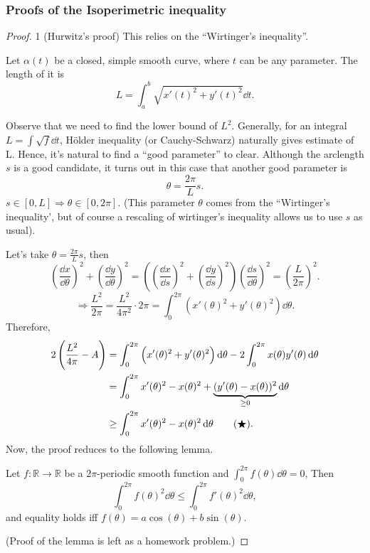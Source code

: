 \subsubsection*{Proofs of the Isoperimetric inequality}
\begin{proof}1 (Hurwitz's proof) This relies on the ``Wirtinger's inequality''.

    Let $\alpha(t)$ be a closed, simple smooth curve, where $t$ can be any parameter. The length of it is
    \[L=\int_a^b\sqrt{x'(t)^2+y'(t)^2}\dd t.\]

    Observe that we need to find the lower bound of $L^2$.
    Generally, for an integral $L=\int \sqrt{f}\dd t$, H\"older
    inequality (or Cauchy-Schwarz) naturally gives estimate of
    L. Hence, it's natural to find a ``good parameter'' to
    clear. Although the arclength $s$ is a good candidate, it
    turns out in this case that another good parameter is
    \[\theta=\frac{2\pi}{L}s.\]
    $s\in [0,L]\Rightarrow \theta \in [0,2\pi]$.
    (This parameter $\theta$ comes from the ``Wirtinger's inequality', but of course a rescaling of wirtinger's inequality allows us to use $s$ as usual).

    Let's take $\theta=\frac{2\pi}{L}s$, then
    \[\left(\frac{\dd x}{\dd \theta}\right)^2+\left(\frac{\dd y}{\dd \theta}\right)^2=\left(\left(\frac{\dd x}{\dd s}\right)^2+\left(\frac{\dd y}{\dd s}\right)^2\right)\left(\frac{\dd s}{\dd \theta}\right)^2=\left(\frac{L}{2\pi}\right)^2.\]
    \[\Rightarrow \frac{L^2}{2\pi}=\frac{L^2}{4\pi^2}\cdot 2\pi=\int_0^{2\pi}\left(x'(\theta)^2+y'(\theta)^2\right)\dd \theta.\]
    Therefore,
    \begin{align}
        2\left(\frac{L^2}{4\pi}-A\right) & =\int_0^{2\pi}\left(x'(\theta)^2+y'(\theta)^2\right)\operatorname{d\!} \theta-2\int_0^{2\pi}x(\theta)y'(\theta)\operatorname{d\!} \theta \notag \\
                                         & =\int_0^{2\pi}x'(\theta)^2-x(\theta)^2+\underbrace{(y'(\theta)-x(\theta))^2}_{\ge 0}\operatorname{d\!} \theta \notag             \\
                                         & \ge \int_0^{2\pi}x'(\theta)^2-x(\theta)^2 \operatorname{d\!} \theta \tag{$\bigstar$}
        .\end{align}
    Now, the proof reduces to the following lemma.

    \begin{lemma}
        Let $f\colon\mathbb{R}\to \mathbb{R}$ be a $2\pi$-periodic smooth
        function and $\int_0^{2\pi}f(\theta)\dd \theta=0$, Then
        \[\int_0^{2\pi}f(\theta)^2\dd \theta\le \int_0^{2\pi}f'(\theta)^2\dd \theta,\]
        and equality holds iff $f(\theta)=a\cos(\theta)+b\sin(\theta)$.
    \end{lemma}
    (Proof of the lemma is left as a homework problem.)


\end{proof}

